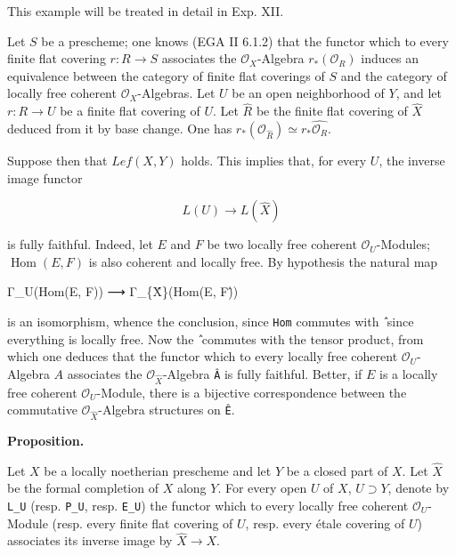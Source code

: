 \documentclass[
]{article}
\newenvironment{Shaded}{}{}
\newcommand{\NormalTok}[1]{#1}
\begin{document}
This example will be treated in detail in Exp. XII.

Let \(S\) be a prescheme; one knows (EGA II 6.1.2) that the functor
which to every finite flat covering \(r: R \to S\) associates the
\(\mathcal{O}_{X}\)-Algebra \(r_{*}(\mathcal{O}_{R})\) induces an
equivalence between the category of finite flat coverings of \(S\) and
the category of locally free coherent \(\mathcal{O}_{X}\)-Algebras. Let
\(U\) be an open neighborhood of \(Y\), and let \(r: R \to U\) be a
finite flat covering of \(U\). Let \(\hat{R}\) be the finite flat
covering of \(\hat{X}\) deduced from it by base change. One has
\(\hat{r}_{*}(\mathcal{O}_{\hat{R}}) \simeq r_{*}\hat{\mathcal{O}_{R}}\).

Suppose then that \(Lef(X, Y)\) holds. This implies that, for every
\(U\), the inverse image functor

\[
L(U) \longrightarrow L(\hat{X})
\]

is fully faithful. Indeed, let \(E\) and \(F\) be two locally free
coherent \(\mathcal{O}_{U}\)-Modules; \(\operatorname{Hom}(E, F)\) is
also coherent and locally free. By hypothesis the natural map

\begin{Shaded}
\begin{Highlighting}[]
\NormalTok{Γ\_U(Hom(E, F)) ⟶ Γ\_\{X̂\}(Hom(E, F)̂)}
\end{Highlighting}
\end{Shaded}

is an isomorphism, whence the conclusion, since \texttt{Hom} commutes
with \texttt{̂} since everything is locally free. Now the \texttt{̂}
commutes with the tensor product, from which one deduces that the
functor which to every locally free coherent \(\mathcal{O}_{U}\)-Algebra
\(A\) associates the \(\mathcal{O}_{\hat{X}}\)-Algebra \texttt{Â} is
fully faithful. Better, if \(E\) is a locally free coherent
\(\mathcal{O}_{U}\)-Module, there is a bijective correspondence between
the commutative \(\mathcal{O}_{\hat{X}}\)-Algebra structures on
\texttt{Ê}.

\textbf{Proposition.}

Let \(X\) be a locally noetherian prescheme and let \(Y\) be a closed
part of \(X\). Let \(\hat{X}\) be the formal completion of \(X\) along
\(Y\). For every open \(U\) of \(X\), \(U \supset Y\), denote by
\texttt{L\_U} (resp. \texttt{P\_U}, resp. \texttt{E\_U}) the functor
which to every locally free coherent \(\mathcal{O}_{U}\)-Module (resp.
every finite flat covering of \(U\), resp. every étale covering of
\(U\)) associates its inverse image by \(\hat{X} \to X\).
\end{document}
